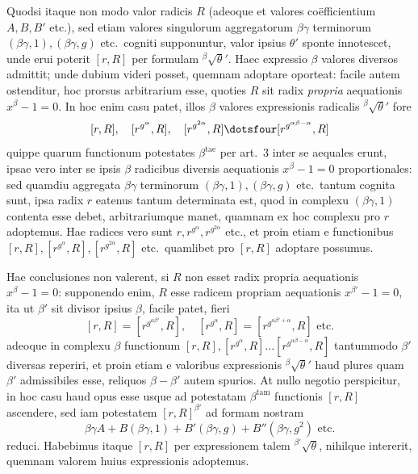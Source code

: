 Quodsi itaque non modo valor radicis $R$ (adeoque et valores coëfficientium $A,B,B'$ etc.), sed etiam valores singulorum aggregatorum $\beta\gamma$ terminorum $(\beta\gamma,1),(\beta\gamma,g)$ etc.\ cogniti supponuntur, valor ipsius $\theta'$ sponte innotescet, unde erui poterit $[r,R]$ per formulam ${}^{\beta}\!\surd\theta'$. Haec expressio $\beta$ valores diversos admittit; unde dubium videri posset, quemnam adoptare oporteat: facile autem ostenditur, hoc prorsus arbitrarium esse, quoties $R$ sit radix \emph{propria} aequationis $x^\beta-1=0$. In hoc enim casu patet, illos $\beta$ valores expressionis radicalis ${}^{\beta}\!\surd\theta'$ fore
\[
[r,R],\quad[r^{g^\alpha},R],\quad[r^{g^{2\alpha}},R]\dotsfour[r^{g^{\alpha\beta-\alpha}},R]
\]
quippe quarum functionum potestates $\beta^{\mathrm{tae}}$ per art.\ 3 inter se aequales erunt, ipsae vero inter se ipsis $\beta$ radicibus diversis aequationis $x^\beta-1=0$ proportionales: sed quamdiu aggregata $\beta\gamma$ terminorum $(\beta\gamma,1),(\beta\gamma,g)$ etc.\ tantum cognita sunt, ipsa radix $r$ eatenus tantum determinata est, quod in complexu $(\beta\gamma,1)$ contenta esse debet, arbitrariumque manet, quamnam ex hoc complexu pro $r$ adoptemus. Hae radices vero sunt $r,r^{g^\alpha},r^{g^{2\alpha}}$ etc., et proin etiam e functionibus $[r,R],[r^{g^\alpha},R],[r^{g^{2\alpha}},R]$ etc.\ quamlibet pro $[r,R]$ adoptare possumus.

Hae conclusiones non valerent, si $R$ non esset radix propria aequationis $x^\beta-1=0$: supponendo enim, $R$ esse radicem propriam aequationis $x^{\beta'}-1=0$, ita ut $\beta'$ sit divisor ipsius $\beta$, facile patet, fieri
\[
[r,R]=[r^{g^{\alpha\beta'}},R],\quad[r^{g^\alpha},R]=[r^{g^{\alpha\beta'+\alpha}},R]\text{ etc.}
\]
adeoque in complexu $\beta$ functionum $[r,R],[r^{g^\alpha},R]\ldots[r^{g^{\alpha\beta-\alpha}},R]$ tantummodo $\beta'$ diversas reperiri, et proin etiam e valoribus expressionis ${}^{\beta}\!\surd\theta'$ haud plures quam $\beta'$ admissibiles esse, reliquos $\beta-\beta'$ autem spurios. At nullo negotio perspicitur, in hoc casu haud opus esse usque ad potestatam $\beta^{\mathrm{tam}}$ functionis $[r,R]$ 
ascendere, sed iam potestatem $[r,R]^{\beta'}$ ad formam nostram
\[
\beta\gamma A+B(\beta\gamma,1)+B'(\beta\gamma,g)+B''(\beta\gamma,g^2)\text{ etc.}
\]
reduci. Habebimus itaque $[r,R]$ per expressionem talem ${}^{\beta'}\!\surd\theta$, nihilque intererit, quemnam valorem huius expressionis adoptemus.

